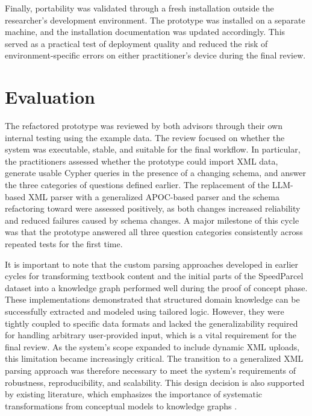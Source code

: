Finally, portability was validated through a fresh installation outside the researcher's development environment. The prototype was installed on a separate machine, and the installation documentation was updated accordingly. This served as a practical test of deployment quality and reduced the risk of environment-specific errors on either practitioner's device during the final review.


\section{Evaluation}
\label{sec:cycle4_evaluation}
The refactored prototype was reviewed by both advisors through their own internal testing using the example data. The review focused on whether the system was executable, stable, and suitable for the final workflow. In particular, the practitioners assessed whether the prototype could import XML data, generate usable Cypher queries in the presence of a changing schema, and answer the three categories of questions defined earlier. The replacement of the LLM-based XML parser with a generalized APOC-based parser and the schema refactoring toward  were assessed positively, as both changes increased reliability and reduced failures caused by schema changes. A major milestone of this cycle was that the prototype answered all three question categories consistently across repeated tests for the first time.

It is important to note that the custom parsing approaches developed in earlier cycles for transforming textbook content and the initial parts of the SpeedParcel dataset into a knowledge graph performed well during the proof of concept phase. These implementations demonstrated that structured domain knowledge can be successfully extracted and modeled using tailored logic. However, they were tightly coupled to specific data formats and lacked the generalizability required for handling arbitrary user-provided input, which is a vital requirement for the final review. As the system’s scope expanded to include dynamic XML uploads, this limitation became increasingly critical. The transition to a generalized XML parsing approach was therefore necessary to meet the system’s requirements of robustness, reproducibility, and scalability. This design decision is also supported by existing literature, which emphasizes the importance of systematic transformations from conceptual models to knowledge graphs \cite{laurenzi2024llm, smajevic2021conceptual}.

